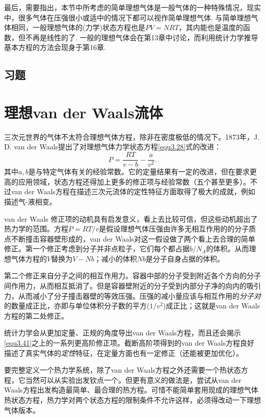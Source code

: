 最后，需要指出，本节中所考虑的简单理想气体是一般气体的一种特殊情况，现实中，很多气体在压强很小或适中的情况下都可以视作简单理想气体. 与简单理想气体相同，一般理想气体的(力学)状态方程也是$PV=NRT$，其内能也是温度的函数，但不再是线性的了. 一般的理想气体会在第13章中讨论，而利用统计力学推导基本方程的方法会现身于第16章.

\subsection*{习题}

\section{理想van der Waals流体}
\label{sec3.5}
三次元世界的气体不太符合理想气体方程，除非在密度极低的情况下。1873年，J. D. van der Waals提出了对理想气体力学状态方程\eqref{equ3.28}式的改进：
\begin{equation}
    P = \frac{RT}{v - b} - \frac{a}{v^2}.
\label{equ3.41}
\end{equation}
其中$a, b$是与特定气体有关的经验常数。它的定量结果有一定的改进，但在要求更高的应用领域，状态方程还得加上更多的修正项与经验常数（五个甚至更多）。不过van der Waals方程在描述三次元流体的定性特征方面取得了极大的成就，例如描述气-液相变。

van der Waals 修正项的动机具有启发意义，看上去比较可信，但这些动机超出了热力学的范围。方程$P = RT/v$是假设理想气体压强由许多无相互作用的的分子质点不断撞击容器壁形成的，van der Waals对这一假设做了两个看上去合理的简单修正。第一个修正考虑到分子并非点粒子，它们每个都占据$b/N_A$的体积。从而理想气体方程的$V$替换为$V - Nb$；减小的体积$Nb$是分子自身占据的体积。

第二个修正来自分子之间的相互作用力。容器中部的分子受到附近各个方向的分子间作用力，从而相互抵消了。但是容器壁附近的分子受到内部分子净的向内的吸引力，从而减小了分子撞击器壁的等效压强。压强的减小量应该与相互作用的{\it 分子对}的数量成正比，亦即与单位体积分子数的平方($1/v^2$)成正比；这就是van der Waals方程的第二处修正。

统计力学会从更加定量、正规的角度导出van der Waals方程，而且还会揭示\eqref{equ3.41}之上的一系列更高阶修正项。截断高阶项得到的van der Waals方程良好描述了真实气体的{\it 定性}特征，在定量方面也有一定修正（还能被更加优化）。

要完整定义一个热力学系统，除了van der Waals方程之外还需要一个热状态方程，它当然可以从实验出发钦点一个。但更有意义的做法是，尝试从van der Waals方程出发构造最简单、最合理的热方程。可惜不能简单套用现成的理想气体热状态方程，热力学对两个状态方程的限制条件不允许这样，必须得改动一下理想气体版本。

